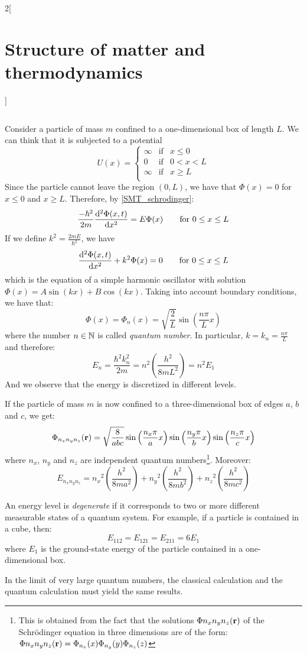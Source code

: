 \documentclass[../../../main.tex]{subfiles}
\begin{document}
\begin{multicols}{2}[\section{Structure of matter and thermodynamics}]
\begin{definition}
\begin{equation}
    \end{equation}
  \end{definition}
  \begin{prop}
    Consider a particle of mass $m$ confined to a one-dimensional box of length $L$. We can think that it is subjected to a potential $$U(x)=\left\{
      \begin{array}{lll}
        \infty & \text{if} & x\leq 0   \\
        0      & \text{if} & 0 < x < L \\
        \infty & \text{if} & x\geq L   \\
      \end{array}
      \right.$$
    Since the particle cannot leave the region $(0,L)$, we have that $\Phi(x)=0$ for $x\leq 0$ and $x\geq L$. Therefore, by \cref{SMT_schrodinger}:
    $$
      \frac{-\hbar^2}{2m}\dv[2]{\Phi(x,t)}{x}=E\Phi(x)\qquad\text{for }0\leq x\leq L
    $$
    If we define $k^2=\frac{2m E}{\hbar^2}$, we have
    $$
      \dv[2]{\Phi(x,t)}{x}+k^2\Phi(x)=0\qquad\text{for }0\leq x\leq L
    $$
    which is the equation of a simple harmonic oscillator with solution $\Phi(x)=A\sin(kx)+B\cos(kx)$. Taking into account boundary conditions, we have that: $$\Phi(x)=\Phi_n(x)=\sqrt{\frac{2}{L}}\sin\left(\frac{n\pi}{L}x\right)$$ where the number $n\in\mathbb{N}$ is called \textit{quantum number}. In particular, $k=k_n=\frac{n\pi}{L}$ and therefore: $$E_n=\frac{\hbar^2k_n^2}{2m}=n^2\left(\frac{h^2}{8mL^2}\right)=n^2E_1$$ And we observe that the energy is discretized in different levels.
  \end{prop}
  \begin{prop}
    If the particle of mass $m$ is now confined to a three-dimensional box of edges $a$, $b$ and $c$, we get:
    $$\Phi_{n_xn_yn_z}(\boldsymbol{\mathrm{r}})=\sqrt{\frac{8}{abc}}\sin\left(\frac{n_x\pi}{a}x\right)\sin\left(\frac{n_y\pi}{b}x\right)\sin\left(\frac{n_z\pi}{c}x\right)$$
    where $n_x$, $n_y$ and $n_z$ are independent quantum numbers\footnote{This is obtained from the fact that the solutions $\Phi{n_xn_yn_z}(\boldsymbol{\mathrm{r}})$ of the Schrödinger equation in three dimensions are of the form: $\Phi{n_xn_yn_z}(\boldsymbol{\mathrm{r}})=\Phi_{n_x}(x)\Phi_{n_y}(y)\Phi_{n_z}(z)$}. Moreover:
    $$E_{n_xn_yn_z}={n_x}^2\left(\frac{h^2}{8ma^2}\right)+{n_y}^2\left(\frac{h^2}{8mb^2}\right)+{n_z}^2\left(\frac{h^2}{8mc^2}\right)$$
  \end{prop}
  \begin{definition}
    An energy level is \textit{degenerate} if it corresponds to two or more different measurable states of a quantum system. For example, if a particle is contained in a cube, then: $$E_{112}=E_{121}=E_{211}=6E_1$$ where $E_1$ is the ground-state energy of the particle contained in a one-dimensional box.
  \end{definition}
  \begin{prop}
    In the limit of very large quantum numbers, the classical calculation and the quantum calculation must yield the same results.
  \end{prop}

\end{multicols}
\end{document}
